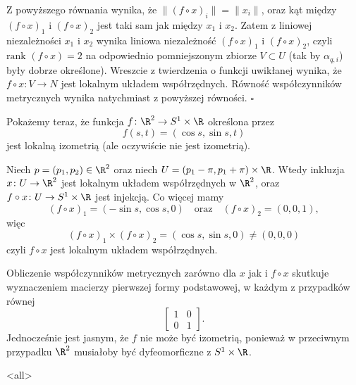 Z powyższego równania wynika, że $\|(f\circ x)_i\|=\|x_i\|$, oraz kąt między $(f\circ x)_1$ i $(f\circ x)_2$ jest taki sam jak między $x_1$ i $x_2$. Zatem z liniowej niezależności $x_1$ i $x_2$ wynika liniowa niezależność $(f\circ x)_1$ i $(f\circ x)_2$, czyli $\text{rank }(f\circ x)=2$ na odpowiednio pomniejszonym zbiorze $V\subset U$ (tak by $\alpha_{q,i}$) były dobrze określone). Wreszcie z twierdzenia o funkcji uwikłanej wynika, że $f\circ x\colon V\to N$ jest lokalnym układem współrzędnych. Równość współczynników metrycznych wynika natychmiast z powyższej równości. \hfill $\square$

\begin{frame}
Pokażemy teraz, że funkcja $f\colon \R^2\to S^1\times \R$ określona przez 
\[f(s,t)=(\cos s,\sin s,t)\]
jest lokalną izometrią (ale oczywiście nie jest izometrią).

\pause Niech $p=(p_1,p_2)\in \R^2$ oraz niech $U=(p_1-\pi,p_1+\pi)\times \R$. Wtedy inkluzja $x\colon U\to \R^2$ jest lokalnym układem współrzędnych w $\R^2$, oraz $f\circ x\colon U\to S^1\times \R$ jest injekcją. \pause Co więcej mamy
\[(f\circ x)_1=(-\sin s, \cos s, 0)\quad\text{oraz}\quad(f\circ x)_2=(0,0,1), \]
więc \[(f\circ x)_1\times (f\circ x)_2=(\cos s, \sin s,0)\neq (0,0,0)\]
czyli $f\circ x$ jest lokalnym układem współrzędnych. 
\end{frame}
\begin{frame}
\pause Obliczenie współczynników metrycznych zarówno dla $x$ jak i $f\circ x$ skutkuje wyznaczeniem macierzy pierwszej formy podstawowej, w każdym z przypadków równej
\[
\left[
\begin{array}{cc}
1 & 0\\
0 & 1
\end{array}\right]
.\]
\pause Jednocześnie jest jasnym, że $f$ nie może być izometrią, ponieważ w przeciwnym przypadku $\R^2$ musiałoby być dyfeomorficzne z $S^1\times \R$.
\end{frame}

\mode<all> 

